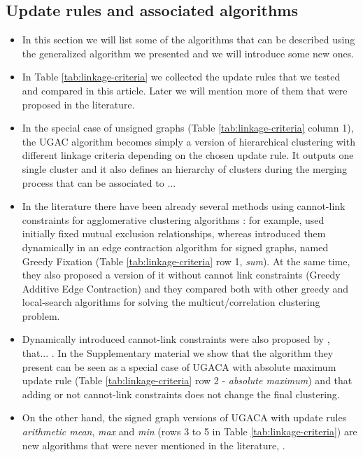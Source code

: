 \subsection{Update rules and associated algorithms}
\begin{itemize}
\item In this section we will list some of the algorithms that can be described using the generalized algorithm we presented and we will introduce some new ones.
\item In Table \ref{tab:linkage-criteria} we collected the update rules that we tested and compared in this article. Later we will mention more of them that were proposed in the literature.
\item In the special case of unsigned graphs (Table \ref{tab:linkage-criteria} column 1), the UGAC algorithm becomes simply a version of hierarchical clustering with different linkage criteria depending on the chosen update rule. It outputs one single cluster and it also defines an hierarchy of clusters during the merging process that can be associated to ...   
\item In the literature there have been already several methods using cannot-link constraints for agglomerative clustering algorithms : for example, \cite{malmberg2011generalized} used initially fixed mutual exclusion relationships, whereas \cite{levinkov2017comparative} introduced them dynamically in an edge contraction algorithm for signed graphs, named Greedy Fixation (Table \ref{tab:linkage-criteria} row 1, \emph{sum}). At the same time, they also proposed a version of it without cannot link constraints (Greedy Additive Edge Contraction) and they compared both with other greedy and local-search algorithms for solving the multicut/correlation clustering problem.
\item Dynamically introduced cannot-link constraints were also proposed by \cite{wolf2018mutex}, that... . In the Supplementary material we show that the algorithm they present can be seen as a special case of UGACA with absolute maximum update rule (Table \ref{tab:linkage-criteria} row 2 - \emph{absolute maximum}) and that adding or not cannot-link constraints does not change the final clustering.
\item On the other hand, the signed graph versions of UGACA with update rules \emph{arithmetic mean}, \emph{max} and \emph{min} (rows 3 to 5 in Table \ref{tab:linkage-criteria}) are new algorithms that were never mentioned in the literature, .

\end{itemize}
